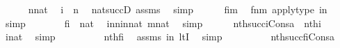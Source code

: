 \begin{isabellebody}
\ \ \ \ \isamarkupfalse%
\ {\isacartoucheopen}n{\isasymin}nat{\isacartoucheclose}\ \isamarkupfalse%
\ {\isachardoublequoteopen}i\ {\isasymin}\ n{\isachardoublequoteclose}\ \isamarkupfalse%
\ nat{\isacharunderscore}{\kern0pt}succD\ assms\ \isamarkupfalse%
\ simp\isanewline
\ \ \ \ \isamarkupfalse%
\ {\isachardoublequoteopen}f{\isacharbackquote}{\kern0pt}i{\isasymin}m{\isachardoublequoteclose}\ \isamarkupfalse%
\ {\isacartoucheopen}f{\isasymin}n{\isasymrightarrow}m{\isacartoucheclose}\ apply{\isacharunderscore}{\kern0pt}type\ {\isacartoucheopen}i{\isasymin}n{\isacartoucheclose}\ \isamarkupfalse%
\ simp\isanewline
\ \ \ \ \isamarkupfalse%
\ \isamarkupfalse%
\ {\isachardoublequoteopen}f{\isacharbackquote}{\kern0pt}i\ {\isasymin}\ nat{\isachardoublequoteclose}\ \isamarkupfalse%
\ in{\isacharunderscore}{\kern0pt}n{\isacharunderscore}{\kern0pt}in{\isacharunderscore}{\kern0pt}nat\ {\isacartoucheopen}m{\isasymin}nat{\isacartoucheclose}\ \isamarkupfalse%
\ simp\isanewline
\ \ \ \ \isamarkupfalse%
\ {\isachardoublequoteopen}nth{\isacharparenleft}{\kern0pt}succ{\isacharparenleft}{\kern0pt}i{\isacharparenright}{\kern0pt}{\isacharcomma}{\kern0pt}Cons{\isacharparenleft}{\kern0pt}a{\isacharcomma}{\kern0pt}{\isasymrho}{\isacharparenright}{\kern0pt}{\isacharparenright}{\kern0pt}\ {\isacharequal}{\kern0pt}\ nth{\isacharparenleft}{\kern0pt}i{\isacharcomma}{\kern0pt}{\isasymrho}{\isacharparenright}{\kern0pt}{\isachardoublequoteclose}\ \isamarkupfalse%
\ {\isacartoucheopen}i{\isasymin}nat{\isacartoucheclose}\ \isamarkupfalse%
\ simp\isanewline
\ \ \ \ \isamarkupfalse%
\ \isamarkupfalse%
\ {\isachardoublequoteopen}{\isachardot}{\kern0pt}{\isachardot}{\kern0pt}{\isachardot}{\kern0pt}\ {\isacharequal}{\kern0pt}\ nth{\isacharparenleft}{\kern0pt}f{\isacharbackquote}{\kern0pt}i{\isacharcomma}{\kern0pt}{\isasymrho}{\isacharprime}{\kern0pt}{\isacharparenright}{\kern0pt}{\isachardoublequoteclose}\ \isamarkupfalse%
\ assms\ {\isacartoucheopen}i{\isasymin}n{\isacartoucheclose}\ ltI\ \isamarkupfalse%
\ simp\isanewline
\ \ \ \ \isamarkupfalse%
\ \isamarkupfalse%
\ {\isachardoublequoteopen}{\isachardot}{\kern0pt}{\isachardot}{\kern0pt}{\isachardot}{\kern0pt}\ {\isacharequal}{\kern0pt}\ nth{\isacharparenleft}{\kern0pt}succ{\isacharparenleft}{\kern0pt}f{\isacharbackquote}{\kern0pt}i{\isacharparenright}{\kern0pt}{\isacharcomma}{\kern0pt}Cons{\isacharparenleft}{\kern0pt}a{\isacharcomma}{\kern0pt}{\isasymrho}{\isacharprime}{\kern0pt}{\isacharparenright}{\kern0pt}{\isacharparenright}{\kern0pt}{\isachardoublequoteclose}\ \isamarkupfalse%

\end{isabellebody}
